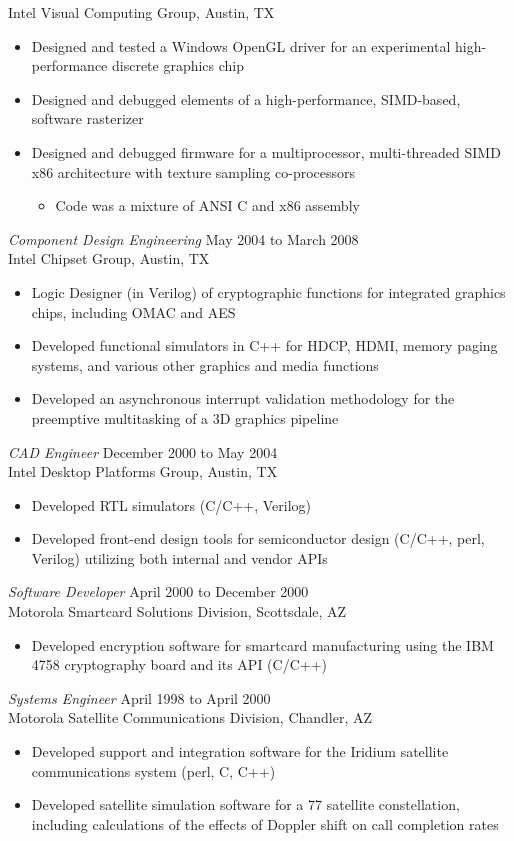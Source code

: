 \documentclass[overlapped]{res}
\begin{document}
\begin{resume}
	Intel Visual Computing Group, Austin, TX
\begin{itemize}
	\item Designed and tested a Windows OpenGL driver for an experimental high-performance discrete graphics chip
	\item Designed and debugged elements of a high-performance, SIMD-based, software rasterizer
	\item Designed and debugged firmware for a multiprocessor, multi-threaded SIMD x86 architecture with texture sampling co-processors
	\begin{itemize}
		\item Code was a mixture of ANSI C and x86 assembly
	\end{itemize}
\end{itemize}
{\sl Component Design Engineering} \hfill May 2004 to March 2008 \\
	Intel Chipset Group, Austin, TX
\begin{itemize}
	\item Logic Designer (in Verilog) of cryptographic functions for integrated graphics chips, including OMAC and AES
	\item Developed functional simulators in C++ for HDCP, HDMI, memory paging systems, and various other graphics and media functions
	\item Developed an asynchronous interrupt validation methodology for the preemptive multitasking of a 3D graphics pipeline
\end{itemize}
{\sl CAD Engineer} \hfill December 2000 to May 2004 \\
	Intel Desktop Platforms Group, Austin, TX
\begin{itemize}
	\item Developed RTL simulators (C/C++, Verilog)
	\item Developed front-end design tools for semiconductor design (C/C++, perl, Verilog) utilizing both internal and vendor APIs
\end{itemize}
{\sl Software Developer} \hfill April 2000 to December 2000 \\
	Motorola Smartcard Solutions Division, Scottsdale, AZ
\begin{itemize}
	\item Developed encryption software for smartcard manufacturing using the IBM 4758 cryptography board and its API (C/C++)
\end{itemize}
{\sl Systems Engineer} \hfill April 1998 to April 2000 \\
	Motorola Satellite Communications Division, Chandler, AZ
\begin{itemize}
	\item Developed support and integration software for the Iridium satellite communications system (perl, C, C++)
	\item Developed satellite simulation software for a 77 satellite constellation, including calculations of the effects of Doppler shift on call completion rates
\end{itemize}

\end{resume}
\end{document}
